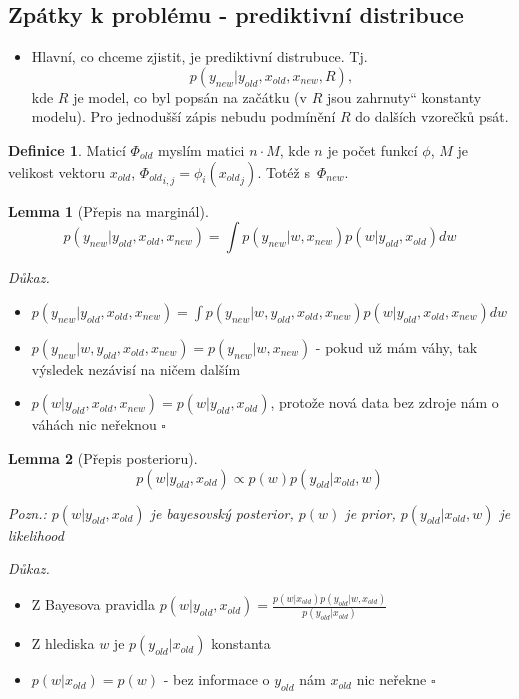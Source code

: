 \documentclass{article}
\newcommand{\uv}[1]{\quotedblbase #1\textquotedblleft}
\newenvironment{pitemize}{
\begin{itemize}
  \setlength{\itemsep}{5pt}
  \setlength{\parskip}{0pt}
  \setlength{\parsep}{0pt}
}{\end{itemize}}
\newenvironment{pproof}{
\noindent\emph{Důkaz.}
\begin{pitemize}
}{\hfill$\square$\end{pitemize}}
\newtheorem{lemma}{Lemma}
\theoremstyle{definition}
\newtheorem{definice}{Definice}
\begin{document}
\subsection{Zpátky k problému - prediktivní distribuce}
\begin{itemize}
\item Hlavní, co chceme zjistit, je prediktivní distrubuce. Tj. $$p(y_{new}|y_{old},x_{old},x_{new},R), $$ kde $R$ je model, co byl popsán na začátku (v $R$ jsou \uv{zahrnuty} konstanty modelu). Pro jednodušší zápis nebudu podmínění $R$ do dalších vzorečků psát.
\end{itemize}

\begin{definice}
Maticí $\Phi_{old}$ myslím matici $n \cdot M$, kde $n$ je počet funkcí $\phi$, $M$ je velikost vektoru $x_{old}$, ${\Phi_{old}}_{i,j}=\phi_i({x_{old}}_{j})$. Totéž s~$\Phi_{new}$.
\end{definice}

\begin{lemma}[Přepis na marginál]
\label{prepis_na_marginal}
$$p(y_{new}|y_{old},x_{old},x_{new})=\int p(y_{new}|w,x_{new})p(w|y_{old},x_{old})dw$$
\end{lemma}

\begin{pproof}
\item $p(y_{new}|y_{old},x_{old},x_{new})=\int p(y_{new}|w,y_{old},x_{old},x_{new})p(w|y_{old},x_{old},x_{new})dw$
\item $ p(y_{new}|w,y_{old},x_{old},x_{new})= p(y_{new}|w,x_{new})$ - pokud už mám váhy, tak výsledek nezávisí na ničem dalším
\item $p(w|y_{old},x_{old},x_{new})=p(w|y_{old},x_{old})$, protože nová data bez zdroje nám o váhách nic neřeknou
\end{pproof}

\begin{lemma}[Přepis posterioru]
\label{prepis}
$$p(w|y_{old},x_{old})\propto p(w)p(y_{old}|x_{old},w)$$

Pozn.: $p(w|y_{old},x_{old})$ je bayesovský posterior, $p(w)$ je prior, $p(y_{old}|x_{old},w)$ je likelihood
\end{lemma}
\begin {pproof}
\item Z Bayesova pravidla $p(w|y_{old},x_{old}) = \frac{p(w|x_{old})p(y_{old}|w,x_{old})}{p(y_{old}|x_{old})}$
\item Z hlediska $w$ je $p(y_{old}|x_{old})$ konstanta
\item $p(w|x_{old})=p(w)$ - bez informace o $y_{old}$ nám $x_{old}$ nic neřekne
\end{pproof}
\end{document}
